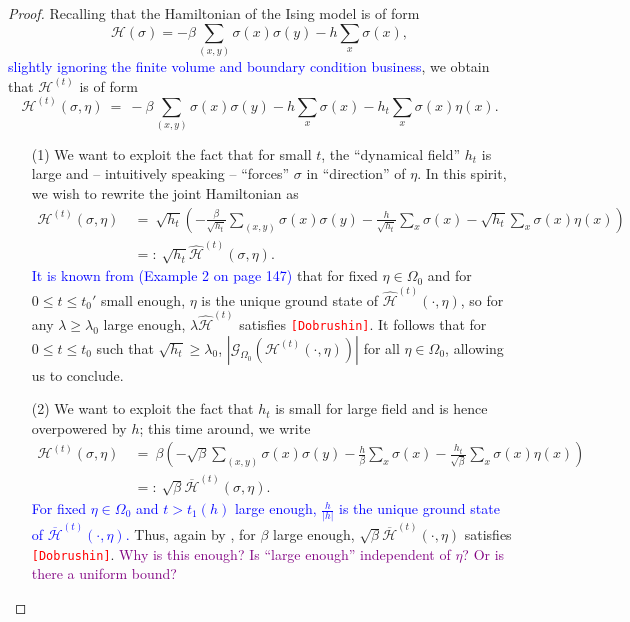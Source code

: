 \documentclass[12pt]{article}
\newcommand{\G}{\mathcal{G}}
\renewcommand{\H}{\mathcal{H}}
\newcommand{\oklepaj}[1]{\left(#1\right)}
\newcommand{\pika}{\boldsymbol{\cdot}}
\newcommand{\1}{\mathbbm{1}}
\newcommand{\5}{\vspace{0.5cm}}
\renewcommand{\hat}{\widehat}
\theoremstyle{definition}
\begin{document}
\begin{proof}
Recalling that the Hamiltonian of the Ising model is of form 
$$\H(\sigma)=-\beta\sum_{(x,y)}\sigma(x)\sigma(y)-h\sum_{x}\sigma(x),$$ 
\textcolor{blue}{slightly ignoring the finite volume and boundary condition business}, we obtain that $\H^{(t)}$ is of form
$$\H^{(t)}(\sigma,\eta) ~=~ -\beta\sum_{(x,y)}\sigma(x)\sigma(y)-h\sum_{x}\sigma(x) - h_t\sum_x \sigma(x)\eta(x).$$
\begin{itemize}
	\item[(1)] We want to exploit the fact that for small $t$, the ``dynamical field'' $h_t$ is large and -- intuitively speaking -- ``forces'' $\sigma$ in ``direction'' of $\eta$. In this spirit, we wish to rewrite the joint Hamiltonian as
\begin{align*}
\H^{(t)}(\sigma,\eta) ~&=~ \sqrt{h_t}\oklepaj{-\frac{\beta}{\sqrt{h_t}}\sum_{(x,y)}\sigma(x)\sigma(y)-\frac{h}{\sqrt{h_t}}\sum_{x}\sigma(x)-\sqrt{h_t}\sum_{x}\sigma(x)\eta(x)} \\
&=:~ \sqrt{h_t}\hat{\H}^{(t)}(\sigma,\eta).
\end{align*}
\textcolor{blue}{It is known from \cite{Geo} (Example 2 on page 147)} that for fixed $\eta\in\Omega_0$ and for $0\leq t\leq t_0'$ small enough, $\eta$ is the unique ground state of $\hat{\H}^{(t)}(\pika,\eta)$, so for any $\lambda\geq\lambda_0$ large enough, $\lambda\hat{\H}^{(t)}$ satisfies \textcolor{red}{\texttt{[Dobrushin]}}. It follows that for $0\leq t\leq t_0$ such that $\sqrt{h_t}\geq \lambda_0$, $|\G_{\Omega_0}(\H^{(t)}(\pika,\eta))|$ for all $\eta\in\Omega_0$, allowing us to conclude.
	\item[(2)] We want to exploit the fact that $h_t$ is small for large field and is hence overpowered by $h$; this time around, we write
\begin{align*}
\H^{(t)}(\sigma,\eta) ~&=~ \beta\oklepaj{-\sqrt{\beta}\sum_{(x,y)}\sigma(x)\sigma(y)-\frac{h}{\beta}\sum_{x}\sigma(x)-\frac{h_t}{\sqrt{\beta}}\sum_{x}\sigma(x)\eta(x)} \\
&=:~ \sqrt{\beta}\overline{\H}^{(t)}(\sigma,\eta).
\end{align*}
\textcolor{blue}{For fixed $\eta\in\Omega_0$ and $t>t_1(h)$ large enough, $\frac{h}{|h|}$ is the unique ground state of $\overline{\H}^{(t)}(\pika,\eta)$.} Thus, again by \cite{Geo}, for $\beta$ large enough, $\sqrt{\beta}\overline{\H}^{(t)}(\pika,\eta)$ satisfies \textcolor{red}{\texttt{[Dobrushin]}}. \textcolor{purple}{Why is this enough? Is ``large enough'' independent of $\eta$? Or is there a uniform bound?}
\end{itemize}
\end{proof}
\end{document}
